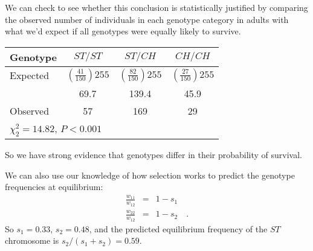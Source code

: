 \documentclass[12pt]{article}
\begin{document}
We can check to see whether this conclusion is statistically justified
by comparing the observed number of individuals in each genotype
category in adults with what we'd expect if all genotypes were equally
likely to survive.
\begin{center}
\begin{tabular}{l|ccc}
\hline\hline
Genotype & $ST/ST$ & $ST/CH$ & $CH/CH$ \\
\hline
Expected & $\left(\frac{41}{150}\right)255$ &
  $\left(\frac{82}{150}\right)255$ & $\left(\frac{27}{150}\right)255$ \\
         & 69.7    & 139.4   & 45.9 \\
Observed & 57      & 169     & 29 \\
\hline
\multicolumn{4}{l}{$\chi^2_2 = 14.82$, $P < 0.001$}
\end{tabular}
\end{center}
So we have strong evidence that genotypes differ in their probability
of survival.

We can also use our knowledge of how selection works to predict the
genotype frequencies at equilibrium:
\begin{eqnarray*}
\frac{w_{11}}{w_{12}} &=& 1 - s_1 \\
\frac{w_{22}}{w_{12}} &=& 1 - s_2 \quad .
\end{eqnarray*}
So $s_1 = 0.33$, $s_2 = 0.48$, and the predicted equilibrium frequency
of the $ST$ chromosome is $s_2/(s_1+s_2) = 0.59$.





\end{document}
